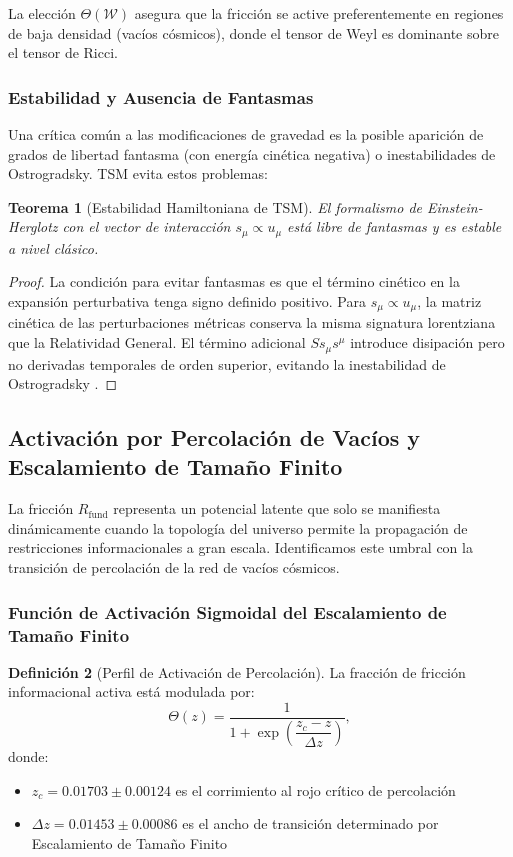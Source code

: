 \documentclass[11pt, a4paper]{article}
\theoremstyle{plain}
\newtheorem{teorema}{Teorema}[section]
\theoremstyle{definition}
\newtheorem{definicion}[teorema]{Definición}
\newcommand{\Rfactor}{R_{\text{fund}}}
\begin{document}
La elección $\Theta(\mathcal{W})$ asegura que la fricción se active preferentemente en regiones de baja densidad (vacíos cósmicos), donde el tensor de Weyl es dominante sobre el tensor de Ricci.

\subsubsection{Estabilidad y Ausencia de Fantasmas}

Una crítica común a las modificaciones de gravedad es la posible aparición de grados de libertad fantasma (con energía cinética negativa) o inestabilidades de Ostrogradsky. TSM evita estos problemas:

\begin{teorema}[Estabilidad Hamiltoniana de TSM]
El formalismo de Einstein-Herglotz con el vector de interacción $s_\mu \propto u_\mu$ está libre de fantasmas y es estable a nivel clásico.
\end{teorema}

\begin{proof}
La condición para evitar fantasmas es que el término cinético en la expansión perturbativa tenga signo definido positivo. Para $s_\mu \propto u_\mu$, la matriz cinética de las perturbaciones métricas conserva la misma signatura lorentziana que la Relatividad General. El término adicional $S s_\mu s^\mu$ introduce disipación pero no derivadas temporales de orden superior, evitando la inestabilidad de Ostrogradsky \cite{Lazo2017}.
\end{proof}

\subsection{Activación por Percolación de Vacíos y Escalamiento de Tamaño Finito}

La fricción $\Rfactor$ representa un potencial latente que solo se manifiesta dinámicamente cuando la topología del universo permite la propagación de restricciones informacionales a gran escala. Identificamos este umbral con la transición de percolación de la red de vacíos cósmicos.

\subsubsection{Función de Activación Sigmoidal del Escalamiento de Tamaño Finito}

\begin{definicion}[Perfil de Activación de Percolación]
La fracción de fricción informacional activa está modulada por:
\begin{equation}
\Theta(z) = \frac{1}{1 + \exp\left(\dfrac{z_c - z}{\Delta z}\right)},
\label{eq:activation_function}
\end{equation}
donde:
\begin{itemize}
    \item $z_c = 0.01703 \pm 0.00124$ es el corrimiento al rojo crítico de percolación
    \item $\Delta z = 0.01453 \pm 0.00086$ es el ancho de transición determinado por Escalamiento de Tamaño Finito
\end{itemize}
\end{definicion}
\end{document}
